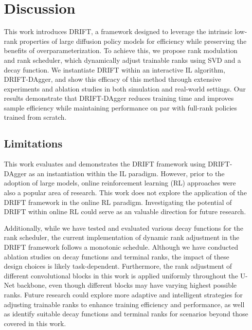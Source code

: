 \section{Discussion}
\label{sec:discussion}

This work introduces DRIFT, a framework designed to leverage the intrinsic low-rank properties of large diffusion policy models for efficiency while preserving the benefits of overparameterization. To achieve this, we propose rank modulation and rank scheduler, which dynamically adjust trainable ranks using SVD and a decay function. We instantiate DRIFT within an interactive IL algorithm, DRIFT-DAgger, and show this efficacy of this method through extensive experiments and ablation studies in both simulation and real-world settings. Our results demonstrate that DRIFT-DAgger reduces training time and improves sample efficiency while maintaining performance on par with full-rank policies trained from scratch.

\subsection{Limitations}
This work evaluates and demonstrates the DRIFT framework using DRIFT-DAgger as an instantiation within the IL paradigm. However, prior to the adoption of large models, online reinforcement learning (RL) approaches \cite{schulman2017proximal, haarnoja2018soft} were also a popular area of research. This work does not explore the application of the DRIFT framework in the online RL paradigm. Investigating the potential of DRIFT within online RL could serve as an valuable direction for future research.

Additionally, while we have tested and evaluated various decay functions for the rank scheduler, the current implementation of dynamic rank adjustment in the DRIFT framework follows a monotonic schedule. Although we have conducted ablation studies on decay functions and terminal ranks, the impact of these design choices is likely task-dependent. Furthermore, the rank adjustment of different convolutional blocks in this work is applied uniformly throughout the U-Net backbone, even though different blocks may have varying highest possible ranks. Future research could explore more adaptive and intelligent strategies for adjusting trainable ranks to enhance training efficiency and performance, as well as identify suitable decay functions and terminal ranks for scenarios beyond those covered in this work.


